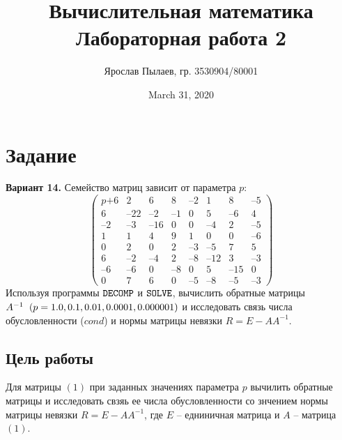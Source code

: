 \documentclass[a4paper,11pt]{article}
\title{Вычислительная математика \\ Лабораторная работа 2}
\author{Ярослав Пылаев, гр. 3530904/80001}
\date{March 31, 2020}
\begin{document}
\maketitle
\newpage

\section{Задание}
\noindent \textbf{Вариант 14.} Семейство матриц зависит от параметра $p$:
\begin{equation}
  \begin{pmatrix}
    p\text{+}6 & 2 & 6 & 8 & \text{--}2 & 1 & 8 & \text{--}5 \\
    6 & \text{--}22 & \text{--}2 & \text{--}1 & 0 & 5 & \text{--}6 & 4 \\
    \text{--}2 & \text{--}3 & \text{--}16 & 0 & 0 & \text{--}4 & 2 & \text{--}5 \\
    1 & 1 & 4 & 9 & 1 & 0 & 0 & \text{--}6 \\
    0 & 2 & 0 & 2 & \text{--}3 & \text{--}5 & 7 & 5 \\
    6 & \text{--}2 & \text{--}4 & 2 & \text{--}8 & \text{--}12 & 3 & \text{--}3 \\
    \text{--}6 & \text{--}6 & 0 & \text{--}8 & 0 & 5 & \text{--}15 & 0 \\
    0 & 7 & 6 & 0 & \text{--}5 & \text{--}8 & \text{--}5 & \text{--}3
  \end{pmatrix}
\end{equation}
Используя программы $\verb|DECOMP|$ и $\verb|SOLVE|$, вычислить обратные
      матрицы $A^{-1} \hspace{2mm}(p = 1.0, 0.1, 0.01, 0.0001, 0.000001)$ и
      исследовать связь числа обусловленности ($cond$) и нормы матрицы невязки $R = E - AA^{-1}$.

\subsection{Цель работы}
\noindent Для матрицы $(1)$ при заданных значениях параметра $p$ вычилить обратные матрицы
      и исследовать свзяь ее числа обусловленности со знчением нормы матрицы невязки
      $R = E - AA^{-1}$, где $E$ -- едниничная матрица и $A$ -- матрица $(1)$.
\end{document}
